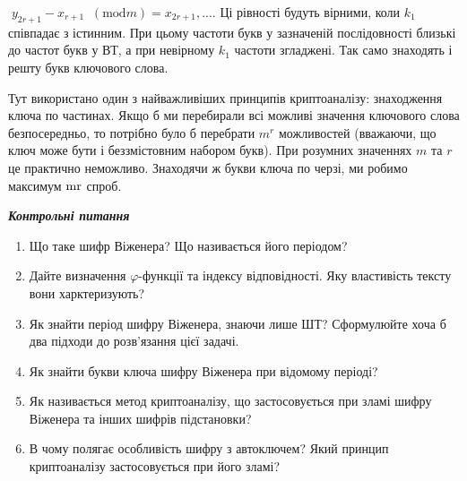 \documentclass[a4paper]{article}
\newcommand\liststyleWWviiiNumxiii{%
\renewcommand\theenumi{\arabic{enumi}}
\renewcommand\theenumii{\alph{enumii}}
\renewcommand\theenumiii{\roman{enumiii}}
\renewcommand\theenumiv{\arabic{enumiv}}
\renewcommand\labelenumi{\theenumi.}
\renewcommand\labelenumii{\theenumii.}
\renewcommand\labelenumiii{\theenumiii.}
\renewcommand\labelenumiv{\theenumiv.}
}
\newcounter{}
\newcommand\normalsubformula[1]{\text{\mathversion{normal}$#1$}}
\begin{document}
${\;y_{{2r+1}}-x_{{r+1}}\;\;(\text{mod}m)=x_{{2r+1}},\text{.}\text{.}\text{.}}$.
Ці рівності будуть вірними, коли  ${k_{{1}}}$ співпадає з істинним. При цьому
частоти букв у зазначеній послідовності близькі до частот букв у ВТ, а при
невірному  ${k_{{1}}}$ частоти згладжені. Так само знаходять і решту букв
ключового слова.

Тут використано один з найважливіших принципів криптоаналізу: знаходження ключа
по частинах. Якщо б ми перебирали всі можливі значення ключового слова
безпосередньо, то потрібно було б перебрати  ${m^{{r}}}$ можливостей (вважаючи,
що ключ може бути і беззмістовним набором букв). При розумних значеннях  ${m}$
та  ${r}$ це практично неможливо. Знаходячи ж букви ключа по черзі, ми робимо
максимум  ${\normalsubformula{\text{mr}}}$ спроб.


\bigskip


\bigskip

{\centering\bfseries\itshape
Контрольні питання
\par}


\bigskip


\bigskip

\liststyleWWviiiNumxiii
\begin{enumerate}
\item Що таке шифр Віженера? Що називається його періодом?
\item Дайте визначення  ${\varphi }${}-функції та індексу відповідності. Яку
властивість тексту вони харктеризують?
\item Як знайти період шифру Віженера, знаючи лише ШТ? Сформулюйте хоча б два
підходи до розв’язання цієї задачі.
\item Як знайти букви ключа шифру Віженера при відомому періоді?
\item Як називається метод криптоаналізу, що застосовується при зламі шифру
Віженера та інших шифрів підстановки?
\item В чому полягає особливість шифру з автоключем? Який принцип криптоаналізу
застосовується при його зламі?
\end{enumerate}

\bigskip


\bigskip


\bigskip


\bigskip


\bigskip


\bigskip


\bigskip


\bigskip


\bigskip
\end{document}
